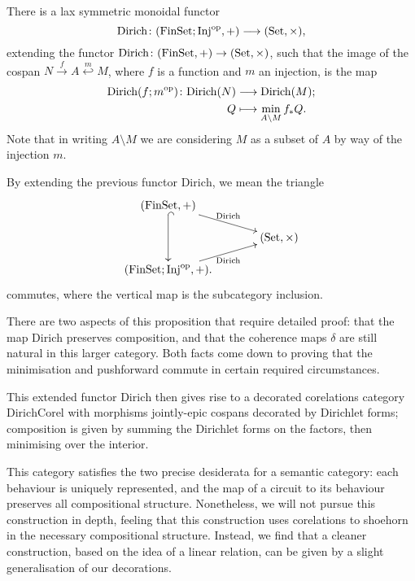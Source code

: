 \begin{proposition}
  There is a lax symmetric monoidal functor
\[
  \mathrm{Dirich}{\colon} (\mathrm{FinSet};\mathrm{Inj}^{\mathrm{op}},+) \longrightarrow
  (\mathrm{Set},\times),
\]
extending the functor $\mathrm{Dirich} {\colon} (\mathrm{FinSet},+) \rightarrow
(\mathrm{Set},\times)$, such that the image of the cospan $N \stackrel{f}\to A
\stackrel{m}\hookleftarrow M$, where $f$ is a function and $m$ an injection, is the
map
\begin{align*}
  \mathrm{Dirich}(f;m^{\mathrm{op}}){\colon} \mathrm{Dirich}(N) &\longrightarrow
  \mathrm{Dirich}(M);\\
  Q &\longmapsto \min_{A\setminus M} f_\ast Q.
\end{align*}
Note that in writing $A \setminus M$ we are considering $M$ as a subset of $A$
by way of the injection $m$.

\end{proposition} 
By extending the previous functor $\mathrm{Dirich}$, we mean the triangle
\[
  \xymatrixcolsep{3pc}
  \xymatrixrowsep{1pc}
  \xymatrix{
    (\FinSet, +) \ar[dr]^{\mathrm{Dirich}} \ar@{^{(}->}[dd] \\
    & (\Set,\times) \\
 (\mathrm{FinSet};\mathrm{Inj}^\opp,+) \ar[ur]_{\mathrm{Dirich}}.
  }
\]
commutes, where the vertical map is the subcategory inclusion.

There are two aspects of this proposition that require detailed proof: that the
map $\mathrm{Dirich}$ preserves composition, and that the coherence maps
$\delta$ are still natural in this larger category. Both facts come down to
proving that the minimisation and pushforward commute in certain required circumstances. 

This extended functor $\mathrm{Dirich}$ then gives rise to a decorated
corelations category $\mathrm{DirichCorel}$ with morphisms jointly-epic cospans
decorated by Dirichlet forms; composition is given by summing the Dirichlet
forms on the factors, then minimising over the interior.

This category satisfies the two precise desiderata for a semantic category: each
behaviour is uniquely represented, and the map of a circuit to its behaviour
preserves all compositional structure. Nonetheless, we will not pursue this
construction in depth, feeling that this construction uses corelations to
shoehorn in the necessary compositional structure. Instead, we find that a
cleaner construction, based on the idea of a linear relation, can be given by
a slight generalisation of our decorations.

